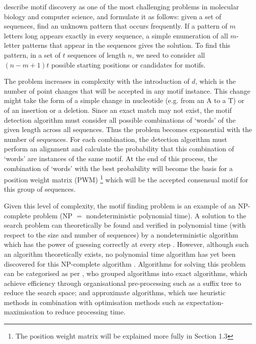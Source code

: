\documentclass[12pt]{article}
\begin{document}
\citet{das2007survey} describe motif discovery as one of the most challenging problems in molecular biology and computer science, and formulate it as follows:
given a set of sequences, find an unknown pattern that occurs frequently. If a pattern of $m$ letters long appears exactly in every sequence, a simple enumeration of all $m$-letter patterns that appear in the sequences gives the solution. To find this pattern, in a set of $t$ sequences of length $n$, we need to consider all $(n - m +1)t$ possible starting positions or candidates for motifs. 

The problem increases in complexity with the introduction of $d$, which is the number of point changes that will be accepted in any motif instance. This change might take the form of a simple change in nucleotide (e.g. from an A to a T) or of an insertion or a deletion. Since an exact match may not exist, the motif detection algorithm must consider all possible combinations of `words' of the given length across all sequences. Thus the problem becomes exponential with the number of sequences. For each combination, the detection algorithm must perform an alignment and calculate the probability that this combination of `words' are instances of the same motif. At the end of this process, the combination of `words' with the best probability will become the basis for a position weight matrix (PWM) \footnote{The position weight matrix will be explained more fully in  Section 1.3} which will be the accepted consensual motif for this group of sequences. 

Given this level of complexity, the motif finding problem is an example of an NP-complete problem \citep{tran2014survey} (NP $=$ nondeterministic polynomial time). A solution to the search problem can theoretically be found and verified in polynomial time (with respect to the size and number of sequences) by a nondeterministic algorithm which has the power of guessing correctly at every step \citep{dasgupta2006algorithms}. However, although such an algorithm theoretically exists, no polynomial time algorithm has yet been discovered for this NP-complete algorithm \citep{cormen2009introduction}.  Algorithms for solving this problem can be categorised as per \citet{sun2015affinity}, who grouped algorithms into exact algorithms, which achieve efficiency through organisational pre-processing such as a suffix tree to reduce the search space; and approximate algorithms, which use heuristic methods in combination with optimisation methods such as expectation-maximisation to reduce processing time.
\newpage
\end{document}
